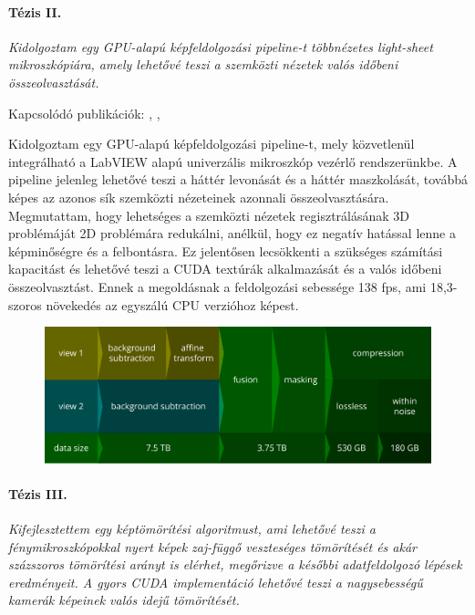 \documentclass{booklet_style}
\begin{document}
  \paragraph{Tézis II.} \textit{Kidolgoztam egy GPU-alapú képfeldolgozási pipeline-t többnézetes light-sheet mikroszkópiára, amely lehetővé teszi a szemközti nézetek valós időbeni összeolvasztását.}

    Kapcsolódó publikációk: \cite{balazs_gpu-based_2016}, \cite{balazs_gpu-based_2016-1}, \cite{balazs_gpu-based_2017}

    Kidolgoztam egy GPU-alapú képfeldolgozási pipeline-t, mely közvetlenül integrálható a LabVIEW alapú univerzális mikroszkóp vezérlő rendszerünkbe. A pipeline jelenleg lehetővé teszi a háttér levonását és a háttér maszkolását, továbbá képes az azonos sík szemközti nézeteinek azonnali összeolvasztására. Megmutattam, hogy lehetséges a szemközti nézetek regisztrálásának 3D problémáját 2D problémára redukálni, anélkül, hogy ez negatív hatással lenne a képminőségre és a felbontásra. Ez jelentősen lecsökkenti a szükséges számítási kapacitást és lehetővé teszi a CUDA textúrák alkalmazását és a valós időbeni összeolvasztást. Ennek a megoldásnak a feldolgozási sebessége 138 fps, ami 18,3-szoros növekedés az egyszálú CPU verzióhoz képest.


    \begin{figure}
      \centering
      \includegraphics[width=\textwidth]{4_gpu/pipeline}
      \label{fig:pipeline}
    \end{figure}
    

  \paragraph{Tézis III.} \textit{Kifejlesztettem egy képtömörítési algoritmust, ami lehetővé teszi a fénymikroszkópokkal nyert képek zaj-függő veszteséges tömörítését és akár százszoros tömörítési arányt is elérhet, megőrizve a későbbi adatfeldolgozó lépések eredményeit. A gyors CUDA implementáció lehetővé teszi a nagysebességű kamerák képeinek valós idejű tömörítését.}
\end{document}
